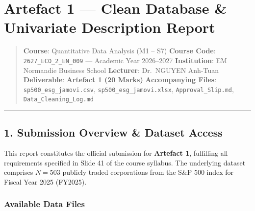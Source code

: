 \documentclass[
]{article}
\author{}
\date{}
\begin{document}
\section{Artefact 1 --- Clean Database \& Univariate Description
Report}\label{artefact-1-clean-database-univariate-description-report}

\begin{quote}
\textbf{Course}: Quantitative Data Analysis (M1 -- S7) \textbf{Course
Code}: \texttt{2627\_ECO\_2\_EN\_009} --- Academic Year 2026--2027
\textbf{Institution}: EM Normandie Business School \textbf{Lecturer}:
Dr.~NGUYEN Anh-Tuan \textbf{Deliverable}: \textbf{Artefact 1 (20 Marks)}
\textbf{Accompanying Files}: \texttt{sp500\_esg\_jamovi.csv},
\texttt{sp500\_esg\_jamovi.xlsx}, \texttt{Approval\_Slip.md},
\texttt{Data\_Cleaning\_Log.md}
\end{quote}

\begin{center}\rule{0.5\linewidth}{0.5pt}\end{center}

\subsection{1. Submission Overview \& Dataset
Access}\label{submission-overview-dataset-access}

This report constitutes the official submission for \textbf{Artefact 1},
fulfilling all requirements specified in Slide 41 of the course
syllabus. The underlying dataset comprises \(N = 503\) publicly traded
corporations from the S\&P 500 index for Fiscal Year 2025 (FY2025).

\subsubsection{Available Data Files}\label{available-data-files}
\end{document}
